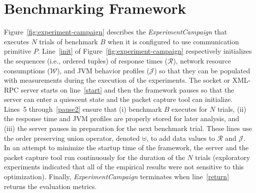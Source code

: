 \documentclass{sig-alternate}
\begin{document}

\vspace*{-.1in}

\section{Benchmarking Framework}
\label{sec:benchmark-framework}



Figure~\ref{fig:experiment-campaign} describes the {\em
  ExperimentCampaign} that executes $N$ trials of benchmark $B$ when
it is configured to use communication primitive $P$. Line~\ref{init}
of Figure~\ref{fig:experiment-campaign} respectively initializes the
sequences (i.e., ordered tuples) of response times ($\mathcal{R}$),
network resource consumptions ($\mathcal{W}$), and JVM behavior
profiles ($\mathcal{J}$) so that they can be populated with
measurements during the execution of the experiments.  The socket or
XML-RPC server starts on line~\ref{start} and then the framework
pauses so that the server can enter a quiescent state and the packet
capture tool can initialize.  Lines~5 through~\ref{pause2} ensure that
(i) benchmark $B$ executes for $N$ trials, (ii) the response time and
JVM profiles are properly stored for later analysis, and (iii) the
server pauses in preparation for the next benchmark trial.  These
lines use the order preserving union operator, denoted $\uplus$, to
add data values to $\mathcal{R}$ and $\mathcal{J}$.  In an attempt to
minimize the startup time of the framework, the server and the packet
capture tool run continuously for the duration of the $N$ trials
(exploratory experiments indicated that all of the empirical results
were not sensitive to this optimization).  Finally, {\em
  ExperimentCampaign} terminates when line~\ref{return} returns the
evaluation metrics.
\end{document}
